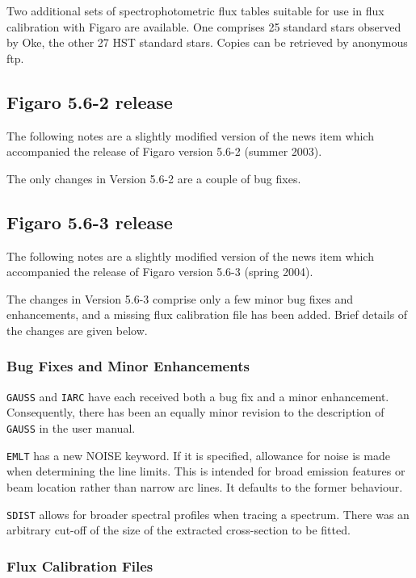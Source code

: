  Two additional sets of spectrophotometric flux tables suitable for use
 in flux calibration with Figaro are available.  One comprises 25 standard
 stars observed by Oke, the other 27 HST standard stars.  Copies can be
 retrieved by anonymous ftp.

\subsection{\label{news562}Figaro 5.6-2 release}

 The following notes are a slightly modified version of the news item
 which accompanied the release of Figaro version 5.6-2 (summer 2003).

 The only changes in Version 5.6-2 are a couple of bug fixes.

\subsection{\label{news563}Figaro 5.6-3 release}

 The following notes are a slightly modified version of the news item
 which accompanied the release of Figaro version 5.6-3 (spring 2004).

 The changes in Version 5.6-3 comprise only a few minor bug fixes
 and enhancements, and a missing flux calibration file has been added.
 Brief details of the changes are given below.

\subsubsection{Bug Fixes and Minor Enhancements}

 {\tt GAUSS} and {\tt IARC} have each received both a bug fix and a minor
 enhancement.  Consequently, there has been an equally minor revision to
 the description of {\tt GAUSS} in the user manual.

 {\tt EMLT} has a new NOISE keyword.  If it is specified, allowance for
 noise is made when determining the line limits.  This is intended for
 broad emission features or beam location rather than narrow arc lines.
 It defaults to the former behaviour.

 {\tt SDIST} allows for broader spectral profiles when tracing a
 spectrum.  There was an arbitrary cut-off of the size of the
 extracted cross-section to be fitted.

\subsubsection{Flux Calibration Files}

